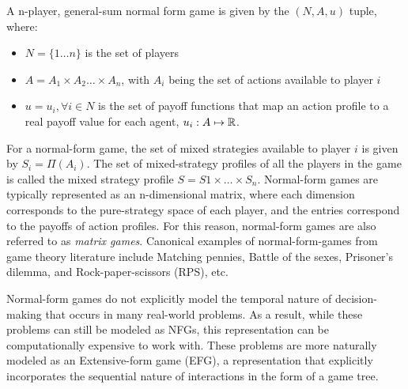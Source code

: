 \begin{definition} A n-player, general-sum normal form game is given by the $(N,
		A, u)$ tuple, where:
	\begin{itemize}
		\item $N = \{1 \dots n \}$ is the set of players
		\item $A =
			      A_1 \times A_2 \ldots \times A_n$, with $A_i$ being the set of actions available to player $i$
		\item $u = {u_i, \forall i \in N}$ is the set of payoff functions that map an action profile to a
		      real payoff value for each agent, $u_i: A \mapsto \mathbb{R}$.
	\end{itemize}
\end{definition}

For a normal-form game, the set of mixed strategies available to player $i$ is given by $S_i =
	\Pi(A_i)$.
The set of mixed-strategy profiles of all the players in the game is called the mixed strategy
profile $S = S1 \times \dots \times S_n$.
Normal-form games are typically represented as an n-dimensional matrix, where each dimension
corresponds to the pure-strategy space of each player, and the entries correspond to the payoffs of
action profiles.
For this reason, normal-form games are also referred to as \textit{matrix games}.
Canonical examples of normal-form-games from game theory literature include Matching pennies,
Battle of the sexes, Prisoner's dilemma, and Rock-paper-scissors (RPS), etc.

Normal-form games do not explicitly model the temporal nature of decision-making that occurs in
many real-world problems.
As a result, while these problems can still be modeled as NFGs, this representation can be
computationally expensive to work with.
These problems are more naturally modeled as an Extensive-form game (EFG), a representation that
explicitly incorporates the sequential nature of interactions in the form of a game tree.

